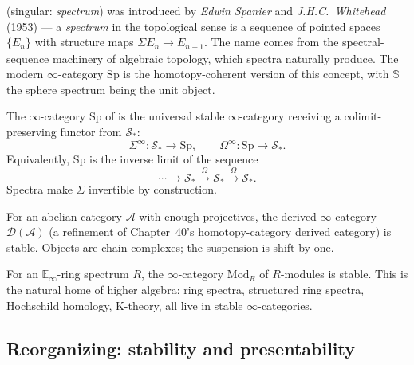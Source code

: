 \begin{nameorigin}
 (singular: \emph{spectrum}) was introduced by
\emph{Edwin Spanier} and \emph{J.H.C.\ Whitehead} (1953) — a
\emph{spectrum} in the topological sense is a sequence of pointed
spaces $\{E_n\}$ with structure maps $\Sigma E_n \to E_{n+1}$. The
name comes from the spectral-sequence machinery of algebraic topology,
which spectra naturally produce. The modern $\infty$-category
$\mathrm{Sp}$ is the homotopy-coherent version of this concept, with
$\mathbb{S}$ the sphere spectrum being the unit object.
\end{nameorigin}

\begin{example_thm}[Spectra]
\label{ex:spectra}
The $\infty$-category $\mathrm{Sp}$ of  is the universal
stable $\infty$-category receiving a colimit-preserving functor from
$\mathcal{S}_*$:
\begin{equation*}
  \Sigma^\infty : \mathcal{S}_* \to \mathrm{Sp}, \qquad \Omega^\infty : \mathrm{Sp} \to \mathcal{S}_*.
\end{equation*}
Equivalently, $\mathrm{Sp}$ is the inverse limit of the sequence
\begin{equation*}
  \cdots \to \mathcal{S}_* \xrightarrow{\Omega} \mathcal{S}_* \xrightarrow{\Omega} \mathcal{S}_*.
\end{equation*}
Spectra make $\Sigma$ invertible by construction.
\end{example_thm}

\begin{example_thm}
\label{ex:derived-stable}
For an abelian category $\mathcal{A}$ with enough projectives, the
derived $\infty$-category $\mathcal{D}(\mathcal{A})$ (a refinement of
Chapter~40's homotopy-category derived category) is stable. Objects
are chain complexes; the suspension is shift by one.
\end{example_thm}

\begin{example_thm}
\label{ex:modules-stable}
For an $\mathbb{E}_\infty$-ring spectrum $R$, the $\infty$-category
$\mathrm{Mod}_R$ of $R$-modules is stable. This is the natural home of
higher algebra: ring spectra, structured ring spectra, Hochschild
homology, K-theory, all live in stable $\infty$-categories.
\end{example_thm}

\subsection{Reorganizing: stability and presentability}

